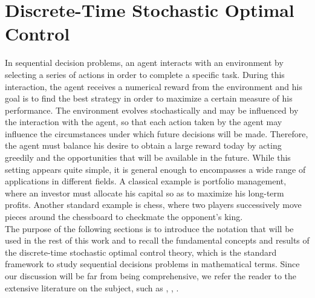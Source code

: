 \chapter{Discrete-Time Stochastic Optimal Control}
\label{ch:discrete_time_stochastic_optimal_control}

In sequential decision problems, an agent interacts with an environment by
selecting a series of actions in order to complete a specific task. During this
interaction, the agent receives a numerical reward from the environment and his
goal is to find the best strategy in order to maximize a certain measure of his
performance. The environment evolves stochastically and may be influenced by
the interaction with the agent, so that each action taken by the agent may 
influence the circumstances under which future decisions will be made. 
Therefore, the agent must balance his desire to obtain a large reward today 
by acting greedily and the opportunities that will be available in the future. 
While this setting appears quite simple, it is general enough to encompasses a 
wide range of applications in different fields. A classical example is 
portfolio management, where an investor must allocate his capital so as to 
maximize his long-term profits. Another standard example is chess, where two
players successively move pieces around the chessboard to checkmate the
opponent's king.\\
The purpose of the following sections is to introduce the notation that will be
used in the rest of this work and to recall the fundamental concepts and 
results of the discrete-time stochastic optimal control theory, which is the 
standard framework to study sequential decisions problems in mathematical
terms. Since our discussion will be far from being comprehensive, we refer the
reader to the extensive literature on the subject, such as
\cite{bertsekas1978stochastic}, \cite{puterman1994markov}, 
\cite{bertsekas1995dynamic}.

